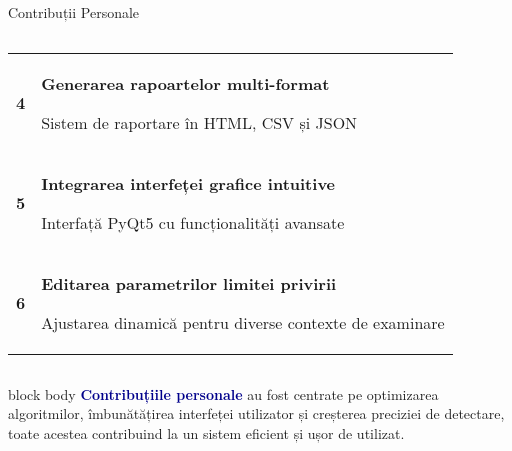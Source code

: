 \documentclass[aspectratio=169,9pt]{beamer}
\newenvironment{cardblock}[1]{%
    \begin{block}{#1}
}{%
    \end{block}
}
\begin{document}
\begin{frame}{Contribuții Personale}
\begin{columns}
                        \begin{cardblock}{}
                                \begin{tabular}{cp{6.3cm}}
                                        \cellcolor{lightblue}\textcolor{mainblue}{\textbf{4}} & 
                                        \begin{minipage}[t]{6.3cm}
                                                \textcolor{mainblue}{\textbf{Generarea rapoartelor multi-format}}
                                                
                                                \scriptsize Sistem de raportare în HTML, CSV și JSON
                                        \end{minipage} \\[0.3cm]
                                        
                                        \cellcolor{lightblue}\textcolor{mainblue}{\textbf{5}} & 
                                        \begin{minipage}[t]{6.3cm}
                                                \textcolor{mainblue}{\textbf{Integrarea interfeței grafice intuitive}}
                                                
                                                \scriptsize Interfață PyQt5 cu funcționalități avansate
                                        \end{minipage} \\[0.3cm]
                                        
                                        \cellcolor{lightblue}\textcolor{mainblue}{\textbf{6}} & 
                                        \begin{minipage}[t]{6.3cm}
                                                \textcolor{mainblue}{\textbf{Editarea parametrilor limitei privirii}}
                                                
                                                \scriptsize Ajustarea dinamică pentru diverse contexte de examinare
                                        \end{minipage}
                                \end{tabular}
                        \end{cardblock}
        \end{columns}
        
        \vspace{0.2cm}
        
        \begin{beamercolorbox}[rounded=true,shadow=false,sep=0.7em]{block body}
                \centering
                \small\textcolor{darkblue}{\textbf{Contribuțiile personale}} au fost centrate pe optimizarea algoritmilor,
                îmbunătățirea interfeței utilizator și creșterea preciziei de detectare, toate acestea contribuind la
                un sistem eficient și ușor de utilizat.
        \end{beamercolorbox}
\end{frame}
\end{document}

